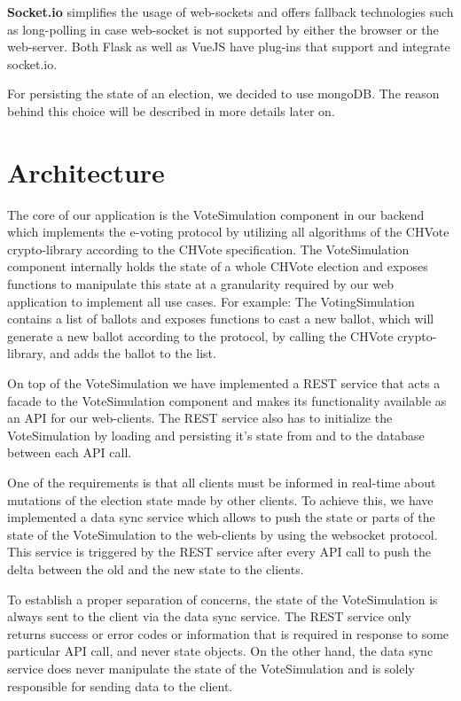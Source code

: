 \textbf{Socket.io} simplifies the usage of web-sockets and offers fallback technologies such as long-polling in case web-socket is not supported by either the browser or the web-server. Both Flask as well as VueJS have plug-ins that support and integrate socket.io.

For persisting the state of an election, we decided to use mongoDB. The reason behind this choice will be described in more details later on.

\section{Architecture}
The core of our application is the VoteSimulation component in our backend which implements the e-voting protocol by utilizing all algorithms of the CHVote crypto-library according to the CHVote specification. The VoteSimulation component internally holds the state of a whole CHVote election and exposes functions to manipulate this state at a granularity required by our web application to implement all use cases. For example: The VotingSimulation contains a list of ballots and exposes functions to cast a new ballot, which will generate a new ballot according to the protocol, by calling the CHVote crypto-library, and adds the ballot to the list.

On top of the VoteSimulation we have implemented a REST service that acts a facade to the VoteSimulation component and makes its functionality available as an API for our web-clients. The REST service also has to initialize the VoteSimulation by loading and persisting it's state from and to the database between each API call.

One of the requirements is that all clients must be informed in real-time about mutations of the election state made by other clients. To achieve this, we have implemented a data sync service which allows to push the state or parts of the state of the VoteSimulation to the web-clients by using the websocket protocol. This service is triggered by the REST service after every API call to push the delta between the old and the new state to the clients.

To establish a proper separation of concerns, the state of the VoteSimulation is always sent to the client via the data sync service. The REST service only returns success or error codes or information that is required in response to some particular API call, and never state objects. On the other hand, the data sync service does never manipulate the state of the VoteSimulation and is solely responsible for sending data to the client.

